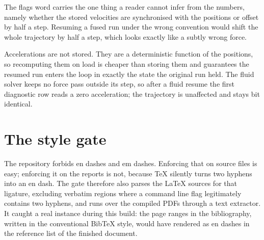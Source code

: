 The flags word carries the one thing a reader cannot infer
from the numbers, namely whether the stored velocities are synchronised with
the positions or offset by half a step. Resuming a fused run under the wrong
convention would shift the whole trajectory by half a step, which looks exactly
like a subtly wrong force.

Accelerations are not stored. They are a deterministic function of the
positions, so recomputing them on load is cheaper than storing them and
guarantees the resumed run enters the loop in exactly the state the original
run held. The fluid solver keeps no force pass outside its step, so after a fluid resume the
first diagnostic row reads a zero acceleration; the trajectory is unaffected and stays bit
identical.

\section{The style gate}

The repository forbids en dashes and em dashes. Enforcing that on source files
is easy; enforcing it on the reports is not, because TeX silently turns two
hyphens into an en dash. The gate therefore also parses the LaTeX sources for
that ligature, excluding verbatim regions where a command line flag legitimately
contains two hyphens, and runs over the compiled PDFs through a text extractor.
It caught a real instance during this build: the page ranges in the
bibliography, written in the conventional BibTeX style, would have rendered as
en dashes in the reference list of the finished document.
